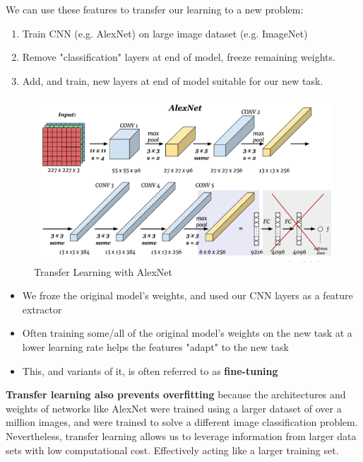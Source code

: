 We can use these features to transfer our learning to a new problem:
\begin{enumerate}
    \item Train CNN (e.g. AlexNet) on large image dataset (e.g. ImageNet)
    \item Remove "classification" layers at end of model, freeze remaining weights.
    \item Add, and train, new layers at end of model suitable for our new task.
\end{enumerate}

\begin{figure}[h!t]
    \centering
    \includegraphics[width=0.45\linewidth]{transferlearning.png}
    \caption{Transfer Learning with AlexNet}
    \label{fig:enter-label}
\end{figure}

\begin{itemize}
    \item We froze the original model's weights, and used our CNN layers as a feature extractor
    \item Often training some/all of the original model's weights on the new task at a lower learning rate helps the features "adapt" to the new task
    \item This, and variants of it, is often referred to as \textbf{fine-tuning}

\end{itemize}

\begin{idea}
    \textbf{Transfer learning also prevents overfitting} because the architectures and weights of networks like AlexNet were trained using a larger dataset of over a million images, and were trained to solve a different image classification problem. Nevertheless, transfer learning allows us to leverage information from larger data sets with low computational cost. Effectively acting like a larger training set.
\end{idea}